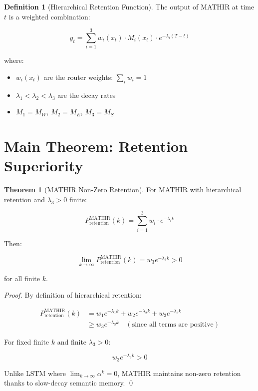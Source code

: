 \documentclass[12pt]{article}
\theoremstyle{definition}
\newtheorem{theorem}{Theorem}
\newtheorem{definition}{Definition}
\begin{document}
\begin{definition}[Hierarchical Retention Function]
The output of MATHIR at time $t$ is a weighted combination:

\begin{equation}
y_t = \sum_{i=1}^{3} w_i(x_t) \cdot M_i(x_t) \cdot e^{-\lambda_i (T-t)}
\end{equation}

where:
\begin{itemize}
\item $w_i(x_t)$ are the router weights: $\sum_i w_i = 1$
\item $\lambda_1 < \lambda_2 < \lambda_3$ are the decay rates
\item $M_1 = M_W$, $M_2 = M_E$, $M_3 = M_S$
\end{itemize}
\end{definition}

\section{Main Theorem: Retention Superiority}

\begin{theorem}[MATHIR Non-Zero Retention]
For MATHIR with hierarchical retention and $\lambda_3 > 0$ finite:

\begin{equation}
P_{\text{retention}}^{\text{MATHIR}}(k) = \sum_{i=1}^{3} w_i \cdot e^{-\lambda_i k}
\end{equation}

Then:

\begin{equation}
\lim_{k \to \infty} P_{\text{retention}}^{\text{MATHIR}}(k) = w_3 e^{-\lambda_3 k} > 0
\end{equation}

for all finite $k$.
\end{theorem}

\begin{proof}
By definition of hierarchical retention:

\begin{align}
P_{\text{retention}}^{\text{MATHIR}}(k) 
&= w_1 e^{-\lambda_1 k} + w_2 e^{-\lambda_2 k} + w_3 e^{-\lambda_3 k} \\
&\geq w_3 e^{-\lambda_3 k} \quad (\text{since all terms are positive})
\end{align}

For fixed finite $k$ and finite $\lambda_3 > 0$:

\begin{equation}
w_3 e^{-\lambda_3 k} > 0
\end{equation}

Unlike LSTM where $\lim_{k \to \infty} \alpha^k = 0$, MATHIR 
maintains non-zero retention thanks to slow-decay semantic memory. \qed
\end{proof}
\end{document}
